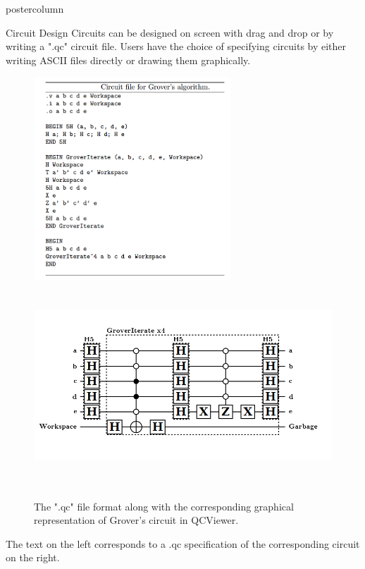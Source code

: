 \documentclass[final]{beamer} %
\begin{document}
\begin{frame}{}
\begin{columns}
        \begin{column}{.33\textwidth}
        \begin{beamercolorbox}[center,wd=\textwidth]{postercolumn}
        \begin{minipage}[c][0.95\textheight][s]{0.95\columnwidth}
            \begin{block}{\large Circuit Design}
                Circuits can be designed on screen with drag and drop or by writing a ".qc" circuit file. 
                Users have the choice of specifying circuits by either writing ASCII files directly or drawing them graphically. 
		        \begin{figure}[!htbp]
		            \centering
		            \includegraphics[height=3in]{figures/Grover_Text.png} \ \ \ \  \includegraphics[height=3in]{figures/Grover_Circuit.png}
		            \caption{The ".qc" file format along with the corresponding graphical representation of Grover's circuit in QCViewer.}
		        \end{figure}
                The text on the left corresponds to a .qc specification of the corresponding circuit on the right. 

\end{block}
\end{minipage}
\end{beamercolorbox}
\end{column}
\end{columns}
\end{frame}
\end{document}
